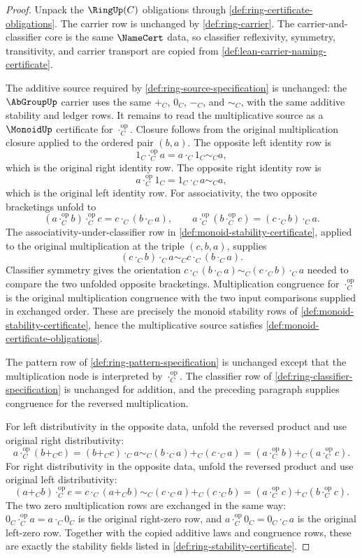 \begin{proof}
Unpack the $\RingUp(C)$ obligations through
\autoref{def:ring-certificate-obligations}. The carrier row is unchanged by
\autoref{def:ring-carrier}. The carrier-and-classifier core is the same
$\NameCert$ data, so classifier reflexivity, symmetry, transitivity, and
carrier transport are copied from \autoref{def:lean-carrier-naming-certificate}.

The additive source required by \autoref{def:ring-source-specification} is
unchanged: the $\AbGroupUp$ carrier uses the same $+_C$, $0_C$, $-_C$, and
$\sim_C$, with the same additive stability and ledger rows. It remains to read
the multiplicative source as a $\MonoidUp$ certificate for
$\cdot_C^{\mathrm{op}}$. Closure follows from the original multiplication
closure applied to the ordered pair $(b,a)$. The opposite left identity row is
$$
1_C\cdot_C^{\mathrm{op}}a=a\cdot_C1_C\sim_C a,
$$
which is the original right identity row. The opposite right identity row is
$$
a\cdot_C^{\mathrm{op}}1_C=1_C\cdot_Ca\sim_C a,
$$
which is the original left identity row. For associativity, the two opposite
bracketings unfold to
$$
(a\cdot_C^{\mathrm{op}}b)\cdot_C^{\mathrm{op}}c
=c\cdot_C(b\cdot_Ca),
\qquad
 a\cdot_C^{\mathrm{op}}(b\cdot_C^{\mathrm{op}}c)
=(c\cdot_Cb)\cdot_Ca.
$$
The associativity-under-classifier row in
\autoref{def:monoid-stability-certificate}, applied to the original
multiplication at the triple $(c,b,a)$, supplies
$$
(c\cdot_Cb)\cdot_Ca\sim_C c\cdot_C(b\cdot_Ca).
$$
Classifier symmetry gives the orientation
$c\cdot_C(b\cdot_Ca)\sim_C(c\cdot_Cb)\cdot_Ca$ needed to compare the two
unfolded opposite bracketings. Multiplication congruence for
$\cdot_C^{\mathrm{op}}$ is the original multiplication congruence with the two
input comparisons supplied in exchanged order. These are precisely the monoid
stability rows of \autoref{def:monoid-stability-certificate}, hence the
multiplicative source satisfies \autoref{def:monoid-certificate-obligations}.

The pattern row of \autoref{def:ring-pattern-specification} is unchanged except
that the multiplication node is interpreted by $\cdot_C^{\mathrm{op}}$. The
classifier row of \autoref{def:ring-classifier-specification} is unchanged for
addition, and the preceding paragraph supplies congruence for the reversed
multiplication.

For left distributivity in the opposite data, unfold the reversed product and
use original right distributivity:
$$
a\cdot_C^{\mathrm{op}}(b+_C c)
=(b+_C c)\cdot_C a
\sim_C
(b\cdot_C a)+_C(c\cdot_C a)
=(a\cdot_C^{\mathrm{op}}b)+_C(a\cdot_C^{\mathrm{op}}c).
$$
For right distributivity in the opposite data, unfold the reversed product and
use original left distributivity:
$$
(a+_C b)\cdot_C^{\mathrm{op}}c
=c\cdot_C(a+_C b)
\sim_C
(c\cdot_C a)+_C(c\cdot_C b)
=(a\cdot_C^{\mathrm{op}}c)+_C(b\cdot_C^{\mathrm{op}}c).
$$
The two zero multiplication rows are exchanged in the same way:
$0_C\cdot_C^{\mathrm{op}}a=a\cdot_C0_C$ is the original right-zero row, and
$a\cdot_C^{\mathrm{op}}0_C=0_C\cdot_Ca$ is the original left-zero row.
Together with the copied additive laws and congruence rows, these are exactly
the stability fields listed in \autoref{def:ring-stability-certificate}.


\end{proof}
